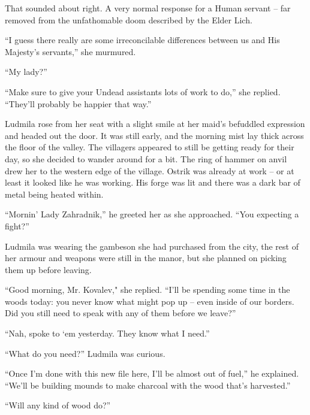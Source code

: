  

That sounded about right. A very normal response for a Human servant – far removed from the unfathomable doom described by the Elder Lich.

 

“I guess there really are some irreconcilable differences between us and His Majesty’s servants,” she murmured.

 

“My lady?”

 

“Make sure to give your Undead assistants lots of work to do,” she replied. “They’ll probably be happier that way.”

 

Ludmila rose from her seat with a slight smile at her maid’s befuddled expression and headed out the door. It was still early, and the morning mist lay thick across the floor of the valley. The villagers appeared to still be getting ready for their day, so she decided to wander around for a bit. The ring of hammer on anvil drew her to the western edge of the village. Ostrik was already at work – or at least it looked like he was working. His forge was lit and there was a dark bar of metal being heated within.

 

“Mornin’ Lady Zahradnik,” he greeted her as she approached. “You expecting a fight?”

 

Ludmila was wearing the gambeson she had purchased from the city, the rest of her armour and weapons were still in the manor, but she planned on picking them up before leaving.

 

“Good morning, Mr. Kovalev," she replied. “I’ll be spending some time in the woods today: you never know what might pop up – even inside of our borders. Did you still need to speak with any of them before we leave?”

 

“Nah, spoke to ‘em yesterday. They know what I need.”

 

“What do you need?” Ludmila was curious.

 

“Once I’m done with this new file here, I’ll be almost out of fuel,” he explained. “We’ll be building mounds to make charcoal with the wood that’s harvested.”

 

“Will any kind of wood do?”

